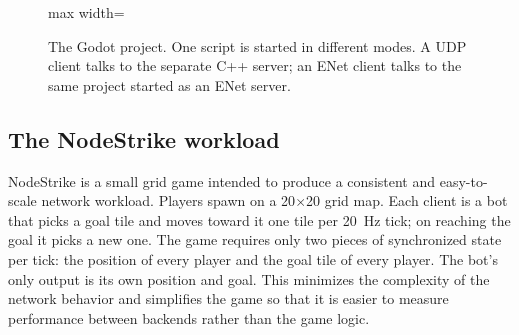 \IfFileExists{IEEEtran.cls}{\ieeetrue\documentclass[conference]{IEEEtran}}{\ieeefalse\documentclass[twocolumn,10pt]{article}}
\begin{document}
\begin{figure}[H]
\centering
\begin{adjustbox}{max width=\columnwidth}\end{adjustbox}
\caption{The Godot project. One script is started in different modes. A UDP client talks to the separate C++ server; an ENet client talks to the same project started as an ENet server.}
\end{figure}

\subsection{The NodeStrike workload}
NodeStrike is a small grid game intended to produce a consistent and easy-to-scale network workload. Players spawn on a 20$\times$20 grid map. Each client is a bot that picks a goal tile and moves toward it one tile per 20~Hz tick; on reaching the goal it picks a new one. The game requires only two pieces of synchronized state per tick: the position of every player and the goal tile of every player. The bot's only output is its own position and goal. This minimizes the complexity of the network behavior and simplifies the game so that it is easier to measure performance between backends rather than the game logic.
\end{document}
